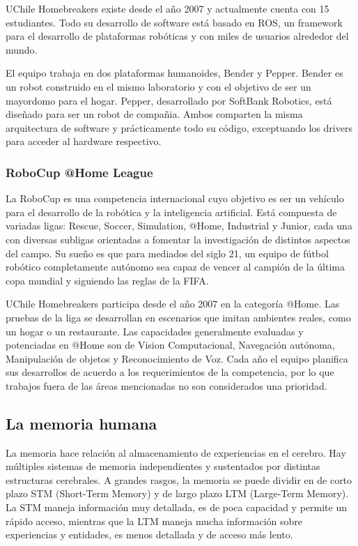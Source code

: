 UChile Homebreakers existe desde el a\~no 2007 y actualmente cuenta con 15 estudiantes. Todo su desarrollo de software est\'a basado en ROS, un framework para el desarrollo de plataformas rob\'oticas y con miles de usuarios alrededor del mundo\cite{ROS:2009}.

El equipo trabaja en dos plataformas humanoides, Bender y Pepper. Bender es un robot construido en el mismo laboratorio y con el objetivo de ser un mayordomo para el hogar. Pepper, desarrollado por SoftBank Robotics, est\'a dise\~nado para ser un robot de compa\~nia. Ambos comparten la misma arquitectura de software y pr\'acticamente todo su c\'odigo, exceptuando los drivers para acceder al hardware respectivo.


\subsubsection{RoboCup @Home League}


La RoboCup es una competencia internacional cuyo objetivo es ser un veh\'iculo para el desarrollo de la rob\'otica y la inteligencia artificial. Est\'a compuesta de variadas ligas: Rescue, Soccer, Simulation, @Home, Industrial y Junior, cada una con diversas subligas orientadas a fomentar la investigaci\'on de distintos aspectos del campo. Su sue\~no es que para mediados del siglo 21, un equipo de f\'utbol rob\'otico completamente aut\'onomo sea capaz de vencer al campi\'on de la \'ultima copa mundial y siguiendo las reglas de la FIFA\cite{robocup:rulebook_2017}.

UChile Homebreakers participa desde el a\~no 2007 en la categor\'ia @Home. Las pruebas de la liga se desarrollan en escenarios que imitan ambientes reales, como un hogar o un restaurante. 
% 
Las capacidades generalmente evaluadas y potenciadas en @Home son de Vision Computacional, Navegaci\'on aut\'onoma, Manipulaci\'on de objetos y Reconocimiento de Voz. Cada a\~no el equipo planifica sus desarrollos de acuerdo a los requerimientos de la competencia, por lo que trabajos fuera de las \'areas mencionadas no son considerados una prioridad.


\subsection{La memoria humana}

La memoria hace relaci\'on al almacenamiento de experiencias en el cerebro. Hay m\'ultiples sistemas de memoria independientes y sustentados por distintas estructuras cerebrales. A grandes rasgos, la memoria se puede dividir en de corto plazo STM (Short-Term Memory) y de largo plazo LTM (Large-Term Memory). La STM maneja informaci\'on muy detallada, es de poca capacidad y permite un r\'apido acceso, mientras que la LTM maneja mucha informaci\'on sobre experiencias y entidades, es menos detallada y de acceso m\'as lento\cite{Eichenbaum:2008}.

